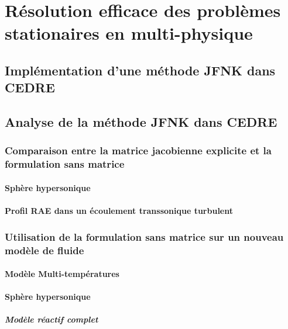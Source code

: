 


\maketitle
\tableofcontents
{}





\part{Résolution efficace des problèmes stationaires en multi-physique}




\chapter{Implémentation d'une méthode JFNK dans CEDRE}

\chapter{Analyse de la méthode JFNK dans CEDRE}
  \section{Comparaison entre la matrice jacobienne explicite et la formulation sans matrice}
    \subsection{Sphère hypersonique}
    \subsection{Profil RAE dans un écoulement transsonique turbulent}
  \section{Utilisation de la formulation sans matrice sur un nouveau modèle de fluide}
    \subsection{Modèle Multi-températures}
    \subsection{Sphère hypersonique}
      \subsubsection{Modèle réactif complet}
